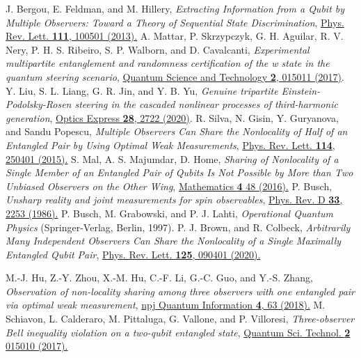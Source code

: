 \documentclass[pra,a4paper,aps,twocolumn,showpacs,superscriptaddress,groupedaddress]{revtex4}
\begin{document}
\begin{thebibliography}{1}
 J. Bergou, E. Feldman, and M. Hillery, \emph{Extracting Information from a Qubit by Multiple Observers: Toward a Theory of Sequential State Discrimination}, \href{https://journals.aps.org/prl/abstract/10.1103/PhysRevLett.111.100501}{Phys. Rev. Lett. {\bf 111}, 100501 (2013).}
  A. Mattar, P. Skrzypczyk, G. H. Aguilar, R. V. Nery, P. H. S. Ribeiro, S. P. Walborn, and D. Cavalcanti, \emph{Experimental multipartite entanglement and randomness certification of the w state in the quantum steering scenario}, \href{https://iopscience.iop.org/article/10.1088/2058-9565/aa629b}{Quantum Science and Technology {\bf 2}, 015011 (2017)}.
 Y. Liu, S. L. Liang, G. R. Jin, and Y. B. Yu, \emph{Genuine tripartite Einstein-Podolsky-Rosen steering in the cascaded nonlinear processes of third-harmonic generation}, \href{https://www.osapublishing.org/oe/abstract.cfm?uri=oe-28-3-2722}{Optics Express {\bf 28}, 2722 (2020)}.
 R. Silva, N. Gisin, Y. Guryanova, and Sandu Popescu, \emph{Multiple Observers Can Share the Nonlocality of Half of an Entangled Pair by Using Optimal Weak Measurements}, \href{https://journals.aps.org/prl/abstract/10.1103/PhysRevLett.114.250401}{Phys. Rev. Lett. {\bf 114}, 250401 (2015).}
 S. Mal, A. S. Majumdar, D. Home, \emph{Sharing of Nonlocality of a Single Member of an Entangled Pair of Qubits Is Not Possible by More than Two Unbiased Observers on the Other Wing}, \href{http://www.mdpi.com/2227-7390/4/3/48/htm}{Mathematics {\bf 4} 48 (2016).}
 P. Busch, \emph{Unsharp reality and joint measurements for spin observables},  \href{https://journals.aps.org/prd/abstract/10.1103/PhysRevD.33.2253}{Phys. Rev. D {\bf 33}, 2253 (1986).}
 P. Busch, M. Grabowski, and P. J. Lahti, \emph{Operational Quantum Physics} (Springer-Verlag, Berlin, 1997).
 P. J. Brown, and R. Colbeck, \emph{Arbitrarily Many Independent Observers Can Share the Nonlocality of a Single Maximally Entangled Qubit Pair}, \href{https://journals.aps.org/prl/abstract/10.1103/PhysRevLett.125.090401}{Phys. Rev. Lett. {\bf 125}, 090401 (2020).}





 M.-J. Hu, Z.-Y. Zhou, X.-M. Hu, C.-F. Li, G.-C. Guo, and Y.-S. Zhang, \emph{Observation of non-locality sharing among three observers with one entangled pair via optimal weak measurement}, \href{https://www.nature.com/articles/s41534-018-0115-x}{npj Quantum Information {\bf 4}, 63 (2018).}
 M. Schiavon, L. Calderaro, M. Pittaluga, G. Vallone, and P. Villoresi, \emph{Three-observer Bell inequality violation on a two-qubit entangled state}, \href{http://iopscience.iop.org/article/10.1088/2058-9565/aa62be/meta}{Quantum Sci. Technol. \textbf{2} 015010 (2017).}


\end{thebibliography}
\end{document}

